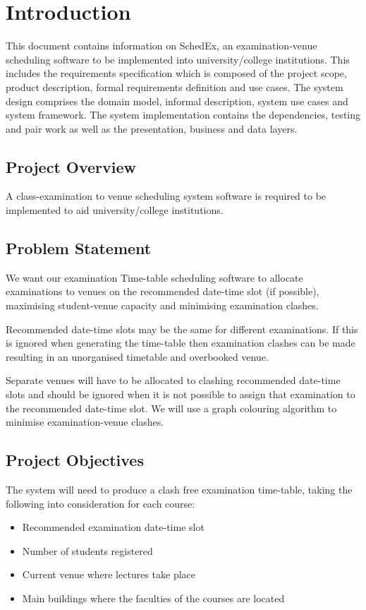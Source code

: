 \documentclass{article}
\begin{document}
\section{Introduction}
This document contains information on SchedEx, an examination-venue scheduling software to be implemented into university/college institutions. This includes the requirements specification which is composed of the project scope, product description, formal requirements definition and use cases. The system design comprises the domain model, informal description, system use cases and system framework. The system implementation contains the dependencies, testing and pair work as well as the presentation, business and data layers.

\subsection{Project Overview}
A class-examination to venue scheduling system software is required to be implemented to aid university/college institutions.

\subsection{Problem Statement}
We want our examination Time-table scheduling software to allocate examinations to venues on the recommended date-time slot (if possible), maximising student-venue capacity and minimising examination clashes.

Recommended date-time slots may be the same for different examinations. If this is ignored when generating the time-table then examination clashes can be made resulting in an unorganised timetable and overbooked venue.

Separate venues will have to be allocated to clashing recommended date-time slots and should be ignored when it is not possible to assign that examination to the recommended date-time slot. We will use a graph colouring algorithm to minimise examination-venue clashes.

\subsection{Project Objectives}
The system will need to produce a clash free examination time-table, taking the following into consideration for each course:
\begin{itemize}
\item Recommended examination date-time slot
\item Number of students registered
\item Current venue where lectures take place
\item Main buildings where the faculties of the courses are located
\end{itemize}
\end{document}
